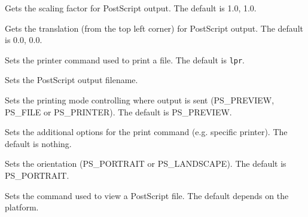 

Gets the scaling factor for PostScript output. The default is 1.0, 1.0.



Gets the translation (from the top left corner) for PostScript output. The default is 0.0, 0.0.



Sets the printer command used to print a file. The default is {\tt lpr}.



Sets the PostScript output filename.



Sets the printing mode controlling where output is sent (PS\_PREVIEW, PS\_FILE or PS\_PRINTER).
The default is PS\_PREVIEW.



Sets the additional options for the print command (e.g. specific printer). The default is nothing.



Sets the orientation (PS\_PORTRAIT or PS\_LANDSCAPE). The default is PS\_PORTRAIT.



Sets the command used to view a PostScript file. The default depends on the platform.



